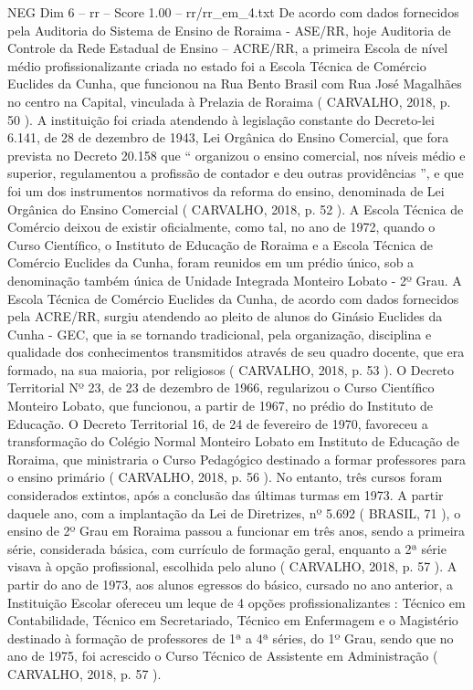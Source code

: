 \begin{textsample}{NEG Dim 6 – rr – Score 1.00 – rr/rr\_em\_4.txt}
De acordo com dados fornecidos pela Auditoria do Sistema de Ensino de Roraima - ASE/RR, hoje Auditoria de Controle da Rede Estadual de Ensino – ACRE/RR, a primeira Escola de nível médio profissionalizante criada no estado foi a Escola Técnica de Comércio Euclides da Cunha, que funcionou na Rua Bento Brasil com Rua José Magalhães no centro na Capital, vinculada à Prelazia de Roraima ( CARVALHO, 2018, p. 50 ).
A instituição foi criada atendendo à legislação constante do Decreto-lei 6.141, de 28 de dezembro de 1943, Lei Orgânica do Ensino Comercial, que fora prevista no Decreto 20.158 que “ organizou o ensino comercial, nos níveis médio e superior, regulamentou a profissão de contador e deu outras providências ”, e que foi um dos instrumentos normativos da reforma do ensino, denominada de Lei Orgânica do Ensino Comercial ( CARVALHO, 2018, p. 52 ).
A Escola Técnica de Comércio deixou de existir oficialmente, como tal, no ano de 1972, quando o Curso Científico, o Instituto de Educação de Roraima e a Escola Técnica de Comércio Euclides da Cunha, foram reunidos em um prédio único, sob a denominação também única de Unidade Integrada Monteiro Lobato - 2º Grau.
A Escola Técnica de Comércio Euclides da Cunha, de acordo com dados fornecidos pela ACRE/RR, surgiu atendendo ao pleito de alunos do Ginásio Euclides da Cunha - GEC, que ia se tornando tradicional, pela organização, disciplina e qualidade dos conhecimentos transmitidos através de seu quadro docente, que era formado, na sua maioria, por religiosos ( CARVALHO, 2018, p. 53 ).
O Decreto Territorial Nº 23, de 23 de dezembro de 1966, regularizou o Curso Científico Monteiro Lobato, que funcionou, a partir de 1967, no prédio do Instituto de Educação.
O Decreto Territorial 16, de 24 de fevereiro de 1970, favoreceu a transformação do Colégio Normal Monteiro Lobato em Instituto de Educação de Roraima, que ministraria o Curso Pedagógico destinado a formar professores para o ensino primário ( CARVALHO, 2018, p. 56 ).
No entanto, três cursos foram considerados extintos, após a conclusão das últimas turmas em 1973.
A partir daquele ano, com a implantação da Lei de Diretrizes, nº 5.692 ( BRASIL, 71 ), o ensino de 2º Grau em Roraima passou a funcionar em três anos, sendo a primeira série, considerada básica, com currículo de formação geral, enquanto a 2ª série visava à opção profissional, escolhida pelo aluno ( CARVALHO, 2018, p. 57 ).
A partir do ano de 1973, aos alunos egressos do básico, cursado no ano anterior, a Instituição Escolar ofereceu um leque de 4 opções profissionalizantes : Técnico em Contabilidade, Técnico em Secretariado, Técnico em Enfermagem e o Magistério destinado à formação de professores de 1ª a 4ª séries, do 1º Grau, sendo que no ano de 1975, foi acrescido o Curso Técnico de Assistente em Administração ( CARVALHO, 2018, p. 57 ).

\end{textsample}
